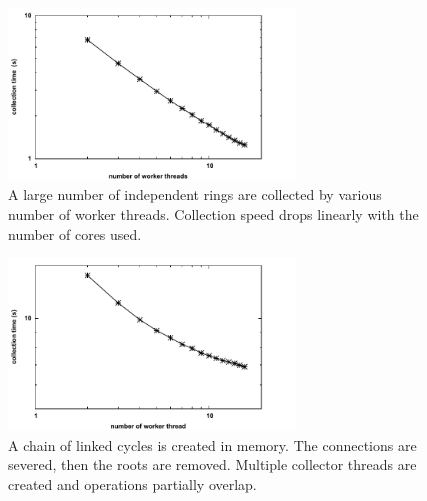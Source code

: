 \begin{figure}[h!]
  \centering
  \includegraphics[height=1.8in,width=3.0in]{figs/CleanupTimeperObjectonly16log}
  \caption{
  A large number of independent rings are collected by various number of
  worker threads. Collection speed drops linearly with the number of
  cores used.
  }
   \label{fig:scale}
  \end{figure}

\begin{figure}[h!]
  \centering
  \includegraphics[height=1.8in,width=3.0in]{figs/collapseoverheadonly16log}
  \caption{A chain of linked cycles is created in memory. The connections are severed,
  then the roots are removed. Multiple collector threads are created and operations
  partially overlap.}
   \label{fig:overhead}
  \end{figure}


